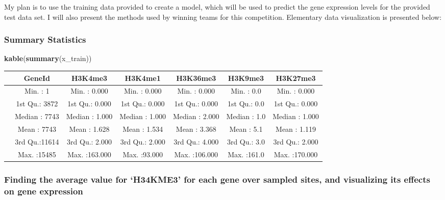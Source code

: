 \documentclass[]{article}
\newenvironment{Shaded}{\begin{snugshade}}{\end{snugshade}}
\newcommand{\KeywordTok}[1]{\textcolor[rgb]{0.13,0.29,0.53}{\textbf{#1}}}
\newcommand{\NormalTok}[1]{#1}
\begin{document}
My plan is to use the training data provided to create a model, which
will be used to predict the gene expression levels for the provided test
data set. I will also present the methods used by winning teams for this
competition. Elementary data visualization is presented below:

\hypertarget{summary-statistics}{%
\subsubsection{Summary Statistics}\label{summary-statistics}}

\begin{Shaded}
\begin{Highlighting}[]
\KeywordTok{kable}\NormalTok{(}\KeywordTok{summary}\NormalTok{(x_train))}
\end{Highlighting}
\end{Shaded}

\begin{longtable}[]{@{}lcccccc@{}}
\toprule
& GeneId & H3K4me3 & H3K4me1 & H3K36me3 & H3K9me3 &
H3K27me3\tabularnewline
\midrule
\endhead
& Min. : 1 & Min. : 0.000 & Min. : 0.000 & Min. : 0.000 & Min. : 0.0 &
Min. : 0.000\tabularnewline
& 1st Qu.: 3872 & 1st Qu.: 0.000 & 1st Qu.: 0.000 & 1st Qu.: 0.000 & 1st
Qu.: 0.0 & 1st Qu.: 0.000\tabularnewline
& Median : 7743 & Median : 1.000 & Median : 1.000 & Median : 2.000 &
Median : 1.0 & Median : 1.000\tabularnewline
& Mean : 7743 & Mean : 1.628 & Mean : 1.534 & Mean : 3.368 & Mean : 5.1
& Mean : 1.119\tabularnewline
& 3rd Qu.:11614 & 3rd Qu.: 2.000 & 3rd Qu.: 2.000 & 3rd Qu.: 4.000 & 3rd
Qu.: 3.0 & 3rd Qu.: 2.000\tabularnewline
& Max. :15485 & Max. :163.000 & Max. :93.000 & Max. :106.000 & Max.
:161.0 & Max. :170.000\tabularnewline
\bottomrule
\end{longtable}

\hypertarget{finding-the-average-value-for-h34kme3-for-each-gene-over-sampled-sites-and-visualizing-its-effects-on-gene-expression}{%
\subsubsection{Finding the average value for `H34KME3' for each gene
over sampled sites, and visualizing its effects on gene
expression}\label{finding-the-average-value-for-h34kme3-for-each-gene-over-sampled-sites-and-visualizing-its-effects-on-gene-expression}}
\end{document}
